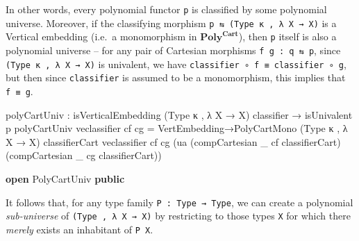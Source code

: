 \documentclass[
  11pt,
  oneside,
  article]{memoir}
\newenvironment{Shaded}{}{}
\newcommand{\KeywordTok}[1]{\textcolor[rgb]{0.00,0.44,0.13}{\textbf{#1}}}
\newcommand{\NormalTok}[1]{#1}
\newcommand{\OtherTok}[1]{\textcolor[rgb]{0.00,0.44,0.13}{#1}}
\theoremstyle{definition}
\theoremstyle{plain}
\newcommand{\0}{\textsf{0}}
\newcommand{\1}{\tn{\textsf{1}}}
\begin{document}
In other words, every polynomial functor \texttt{p} is classified by
some polynomial universe. Moreover, if the classifying morphism
\texttt{p\ ⇆\ (Type\ κ\ ,\ λ\ X\ →\ X)} is a Vertical embedding (i.e.~a
monomorphism in \(\mathbf{Poly}^{\mathbf{Cart}}\)), then \texttt{p}
itself is also a polynomial universe -- for any pair of Cartesian
morphisms \texttt{f\ g\ :\ q\ ⇆\ p}, since
\texttt{(Type\ κ\ ,\ λ\ X\ →\ X)} is univalent, we have
\texttt{classifier\ ∘\ f\ ≡\ classifier\ ∘\ g}, but then since
\texttt{classifier} is assumed to be a monomorphism, this implies that
\texttt{f\ ≡\ g}.

\begin{Shaded}
\begin{Highlighting}[]
\NormalTok{    polyCartUniv }\OtherTok{:}\NormalTok{ isVerticalEmbedding }\OtherTok{(}\NormalTok{Type κ , }\OtherTok{λ}\NormalTok{ X }\OtherTok{→}\NormalTok{ X}\OtherTok{)}\NormalTok{ classifier }
                   \OtherTok{→}\NormalTok{ isUnivalent p}
\NormalTok{    polyCartUniv veclassifier cf cg }\OtherTok{=} 
\NormalTok{        VertEmbedding→PolyCartMono}
            \OtherTok{(}\NormalTok{Type κ , }\OtherTok{λ}\NormalTok{ X }\OtherTok{→}\NormalTok{ X}\OtherTok{)}\NormalTok{ classifierCart veclassifier cf cg }
            \OtherTok{(}\NormalTok{ua }\OtherTok{(}\NormalTok{compCartesian }\OtherTok{\_}\NormalTok{ cf classifierCart}\OtherTok{)} 
                \OtherTok{(}\NormalTok{compCartesian }\OtherTok{\_}\NormalTok{ cg classifierCart}\OtherTok{))}

\KeywordTok{open}\NormalTok{ PolyCartUniv }\KeywordTok{public}
\end{Highlighting}
\end{Shaded}

It follows that, for any type family \texttt{P\ :\ Type\ →\ Type}, we
can create a polynomial \emph{sub-universe} of
\texttt{(Type\ ,\ λ\ X\ →\ X)} by restricting to those types \texttt{X}
for which there \emph{merely} exists an inhabitant of \texttt{P\ X}.
\end{document}
